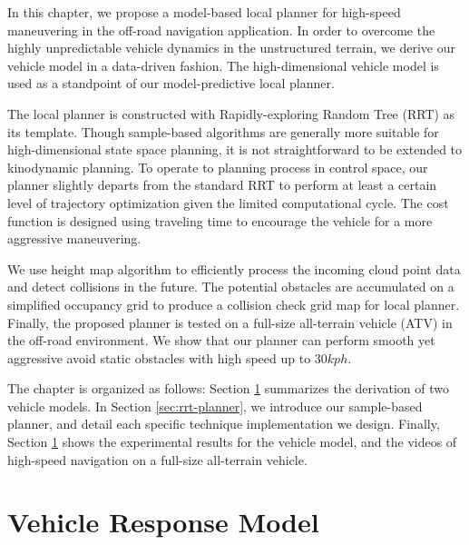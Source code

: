 \documentclass[../thesis.tex]{subfiles}
\begin{document}
 
In this chapter, we propose a model-based local planner for high-speed maneuvering in the off-road navigation application. In order to overcome the highly unpredictable vehicle dynamics in the unstructured terrain, we derive our vehicle model in a data-driven fashion. The high-dimensional vehicle model is used as a standpoint of our model-predictive local planner.
 
The local planner is constructed with Rapidly-exploring Random Tree (RRT) \cite{kuffner2000rrt} as its template.
Though sample-based algorithms are generally more suitable for high-dimensional state space planning, it is not straightforward to be extended to kinodynamic planning.
To operate to planning process in control space, our planner slightly departs from the standard RRT to perform at least a certain level of trajectory optimization given the limited computational cycle.
The cost function is designed using traveling time to encourage the vehicle for a more aggressive maneuvering.
 
We use height map algorithm to efficiently process the incoming cloud point data and detect collisions in the future.
The potential obstacles are accumulated on a simplified occupancy grid to produce a collision check grid map for local planner.
Finally, the proposed planner is tested on a full-size all-terrain vehicle (ATV) in the off-road environment. We show that
our planner can perform smooth yet aggressive avoid static obstacles with high speed up to $30 kph$.
 
The chapter is organized as follows:
Section \ref{sec:vehicle_model} summarizes the derivation of two vehicle models. In Section \ref{sec:rrt-planner}, we introduce our sample-based planner, and detail each specific technique implementation we design. Finally, Section \ref{sec:vehicle_model} shows the experimental results for the vehicle model, and the videos of high-speed navigation on a full-size all-terrain vehicle.
 
\section{Vehicle Response Model} \label{sec:vehicle_model}
 
\end{document}
